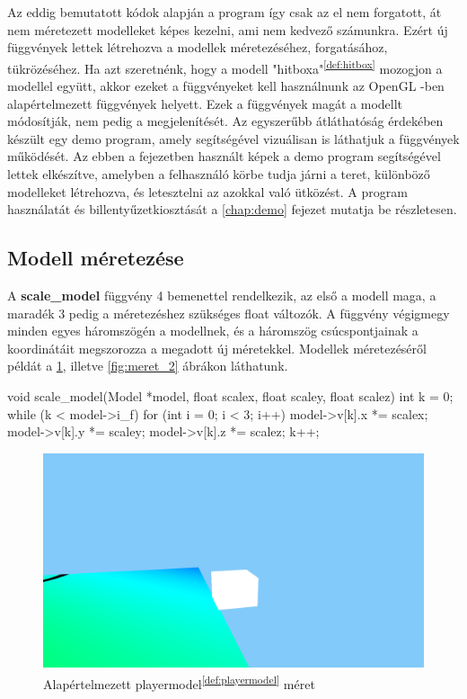 Az eddig bemutatott kódok alapján a program így csak az el nem forgatott, át nem méretezett modelleket képes kezelni, ami nem kedvező számunkra. Ezért új függvények lettek létrehozva a modellek méretezéséhez, forgatásához, tükrözéséhez. Ha azt szeretnénk, hogy a modell "hitboxa"\textsuperscript{\ref{def:hitbox}} mozogjon a modellel együtt, akkor ezeket a függvényeket kell használnunk az OpenGL \cite{OpenGL}-ben alapértelmezett függvények helyett. Ezek a függvények magát a modellt módosítják, nem pedig a megjelenítését. Az egyszerűbb átláthatóság érdekében készült egy demo program, amely segítségével vizuálisan is láthatjuk a függvények működését. Az ebben a fejezetben használt képek a demo program segítségével lettek elkészítve, amelyben a felhasználó körbe tudja járni a teret, különböző modelleket létrehozva, és letesztelni az azokkal való ütközést. A program használatát és billentyűzetkiosztását a \ref{chap:demo} fejezet mutatja be részletesen.

\subsection{Modell méretezése}
A \textbf{scale\_model} függvény 4 bemenettel rendelkezik, az első a modell maga, a maradék 3 pedig a méretezéshez szükséges float változók. A függvény végigmegy minden egyes háromszögén a modellnek, és a háromszög csúcspontjainak a koordinátáit megszorozza a megadott új méretekkel. Modellek méretezéséről példát a \ref{fig:meret_1}, illetve \ref{fig:meret_2} ábrákon láthatunk.
\begin{cpp}
void scale_model(Model *model, float scalex, float scaley, 
float scalez)
{
    int k = 0;
    while (k < model->i_f)
    {
        for (int i = 0; i < 3; i++)
        {
            model->v[k].x *= scalex;
            model->v[k].y *= scaley;
            model->v[k].z *= scalez;
        }
        k++;
    }
}
\end{cpp}


\newpage

\begin{figure}[h]
	\centering
	\includegraphics[width=13truecm, height=7truecm]{images/modell_4.3.1.1.png}
	\caption{Alapértelmezett playermodel\textsuperscript{\ref{def:playermodel}} méret}
	\label{fig:meret_1}
\end{figure}

